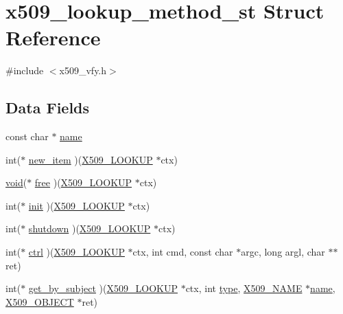 \hypertarget{structx509__lookup__method__st}{}\section{x509\+\_\+lookup\+\_\+method\+\_\+st Struct Reference}
\label{structx509__lookup__method__st}


{\ttfamily \#include $<$x509\+\_\+vfy.\+h$>$}

\subsection*{Data Fields}
\begin{DoxyCompactItemize}
\item 
const char $\ast$ \hyperlink{structx509__lookup__method__st_afcd1706c9144e6d6eee6127661ae3be2}{name}
\item 
int($\ast$ \hyperlink{structx509__lookup__method__st_ab576409e5114506d7b341991b1b8b326}{new\+\_\+item} )(\hyperlink{crypto_2x509_2x509__vfy_8h_afcefc7fb9c7573debf6c1d28b28ff618}{X509\+\_\+\+L\+O\+O\+K\+UP} $\ast$ctx)
\item 
\hyperlink{hw__4758__cca_8h_afad4d591c7931ff6dc5bf69c76c96aa0}{void}($\ast$ \hyperlink{structx509__lookup__method__st_aa54da112826af3a48456e78d3d313a8e}{free} )(\hyperlink{crypto_2x509_2x509__vfy_8h_afcefc7fb9c7573debf6c1d28b28ff618}{X509\+\_\+\+L\+O\+O\+K\+UP} $\ast$ctx)
\item 
int($\ast$ \hyperlink{structx509__lookup__method__st_a179a88b2880ca8627ec6ff57498df590}{init} )(\hyperlink{crypto_2x509_2x509__vfy_8h_afcefc7fb9c7573debf6c1d28b28ff618}{X509\+\_\+\+L\+O\+O\+K\+UP} $\ast$ctx)
\item 
int($\ast$ \hyperlink{structx509__lookup__method__st_a7c73b4174fc8fd50b0a5dbc9f0569997}{shutdown} )(\hyperlink{crypto_2x509_2x509__vfy_8h_afcefc7fb9c7573debf6c1d28b28ff618}{X509\+\_\+\+L\+O\+O\+K\+UP} $\ast$ctx)
\item 
int($\ast$ \hyperlink{structx509__lookup__method__st_a1b459c870696ceaeac69c157c13ade6d}{ctrl} )(\hyperlink{crypto_2x509_2x509__vfy_8h_afcefc7fb9c7573debf6c1d28b28ff618}{X509\+\_\+\+L\+O\+O\+K\+UP} $\ast$ctx, int cmd, const char $\ast$argc, long argl, char $\ast$$\ast$ret)
\item 
int($\ast$ \hyperlink{structx509__lookup__method__st_a8e01859808d19e7d40838c2262b14821}{get\+\_\+by\+\_\+subject} )(\hyperlink{crypto_2x509_2x509__vfy_8h_afcefc7fb9c7573debf6c1d28b28ff618}{X509\+\_\+\+L\+O\+O\+K\+UP} $\ast$ctx, int \hyperlink{include_2openssl_2x509_8h_ab512b8f495325c7ea0f5a5a5d3f938eb}{type}, \hyperlink{crypto_2ossl__typ_8h_a5c5fc036757e87b9bd163d0221696533}{X509\+\_\+\+N\+A\+ME} $\ast$\hyperlink{structx509__lookup__method__st_afcd1706c9144e6d6eee6127661ae3be2}{name}, \hyperlink{crypto_2x509_2x509__vfy_8h_a49c000712efcfeff1e403cb1242052e9}{X509\+\_\+\+O\+B\+J\+E\+CT} $\ast$ret)
$$
\end{DoxyCompactItemize}
